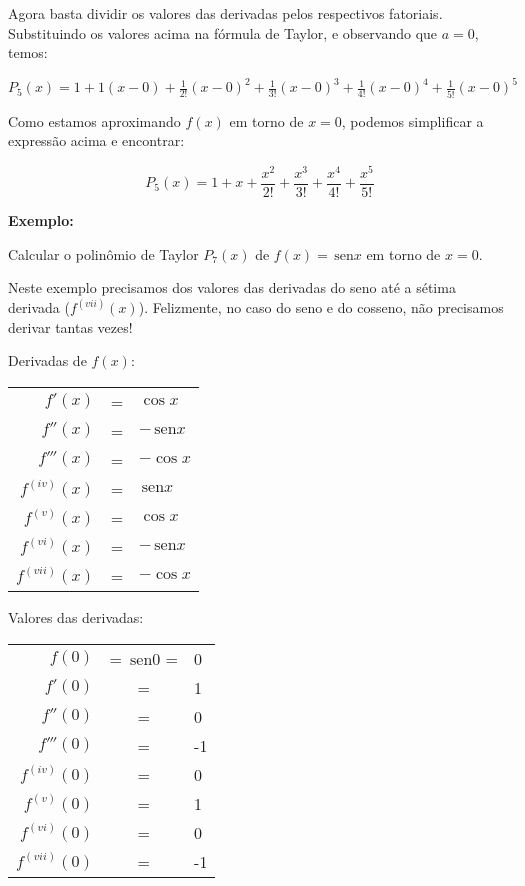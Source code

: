 \documentclass[a4paper]{article}
\providecommand{\sin}{} \renewcommand{\sin}{\hspace{2pt}\mathrm{sen}}
\begin{document}
Agora basta dividir os valores das derivadas pelos respectivos fatoriais.
Substituindo os valores acima na fórmula de Taylor, e observando que $a=0$, temos:

$P_5(x) = 1+ 1(x-0) + \frac{1}{2!}(x-0)^2 + \frac{1}{3!}(x-0)^3 + \frac{1}{4!}(x-0)^4 + \frac{1}{5!}(x-0)^5$

Como estamos aproximando $f(x)$ em torno de $x=0$, podemos simplificar a expressão acima e encontrar:

\begin{displaymath}
  P_5(x) = 1+ x + \frac{x^2}{2!} + \frac{x^3}{3!} + \frac{x^4}{4!} + \frac{x^5}{5!}
\end{displaymath}

\hrulefill

{\bf Exemplo:}

Calcular o polinômio de Taylor $P_7(x)$ de $f(x)=\sin x$ em torno de $x=0$.

Neste exemplo precisamos dos valores das derivadas do seno até a sétima derivada ($f^{(vii)}(x)$).
Felizmente, no caso do seno e do cosseno, não precisamos derivar tantas vezes!

\begin{multicols}{2}

Derivadas de $f(x)$:

  \begin{tabular}{rcl}
    $f'(x)$ &=& $\cos x$\\
    $f''(x)$ &=& $-\sin x$\\
    $f'''(x)$ &=& $-\cos x$\\
    $f^{(iv)}(x)$ &=& $\sin x$\\
    $f^{(v)}(x)$ &=& $\cos x$\\
    $f^{(vi)}(x)$ &=& $-\sin x$\\
    $f^{(vii)}(x)$ &=& $-\cos x$\\
  \end{tabular}

  \columnbreak

Valores das derivadas:

  \begin{tabular}{rcl}
    $f(0)$ &= $\sin 0$ =& 0\\
    $f'(0)$ &=& 1\\
    $f''(0)$ &=& 0\\
    $f'''(0)$ &=& -1\\
    $f^{(iv)}(0)$ &=& 0\\
    $f^{(v)}(0)$ &=& 1\\
    $f^{(vi)}(0)$ &=& 0\\
    $f^{(vii)}(0)$ &=& -1\\
  \end{tabular}
\end{multicols}
\end{document}
